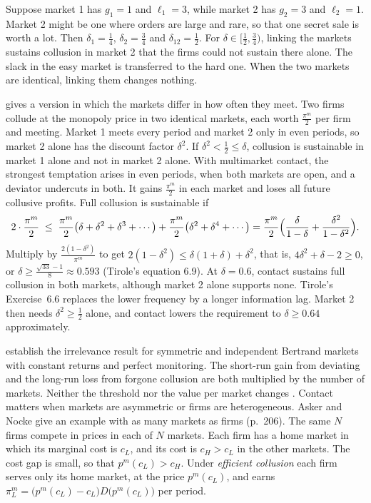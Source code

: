 Suppose market 1 has $g_1 = 1$ and $\ell_1 = 3$, while market 2 has $g_2 = 3$ and $\ell_2 = 1$. Market 2 might be
one where orders are large and rare, so that one secret sale is worth a lot. Then $\delta_1 = \frac{1}{4}$,
$\delta_2 = \frac{3}{4}$ and $\delta_{12} = \frac{1}{2}$. For $\delta \in [\frac{1}{2}, \frac{3}{4})$, linking the
markets sustains collusion in market 2 that the firms could not sustain there alone. The slack in the easy market
is transferred to the hard one. When the two markets are identical, linking them changes nothing.

\citet[section~6.3.2.5]{Tirole1988} gives a version in which the markets differ in how often they meet. Two firms
collude at the monopoly price in two identical markets, each worth $\frac{\pi^m}{2}$ per firm and meeting. Market 1
meets every period and market 2 only in even periods, so market 2 alone has the discount factor $\delta^2$. If
$\delta^2 < \frac{1}{2} \le \delta$, collusion is sustainable in market 1 alone and not in market 2 alone. With
multimarket contact, the strongest temptation arises in even periods, when both markets are open, and a deviator
undercuts in both. It gains $\frac{\pi^m}{2}$ in each market and loses all future collusive profits. Full collusion
is sustainable if
\begin{equation*}
2\cdot\frac{\pi^m}{2} \;\le\; \frac{\pi^m}{2}\bigl(\delta + \delta^2 + \delta^3 + \cdots\bigr)
+ \frac{\pi^m}{2}\bigl(\delta^2 + \delta^4 + \cdots\bigr)
= \frac{\pi^m}{2}\Bigl(\frac{\delta}{1 - \delta} + \frac{\delta^2}{1 - \delta^2}\Bigr) .
\end{equation*}
Multiply by $\frac{2(1 - \delta^2)}{\pi^m}$ to get $2(1 - \delta^2) \le \delta(1 + \delta) + \delta^2$, that is,
$4\delta^2 + \delta - 2 \ge 0$, or $\delta \ge \frac{\sqrt{33} - 1}{8} \approx 0.593$ (Tirole's equation 6.9). At
$\delta = 0.6$, contact sustains full collusion in both markets, although market 2 alone supports none.
Tirole's Exercise~6.6 replaces the lower frequency by a longer information lag. Market 2 then needs $\delta^2 \ge
\frac{1}{2}$ alone, and contact lowers the requirement to $\delta \ge 0.64$ approximately.

\citet{BernheimWhinston1990} establish the irrelevance result for symmetric and independent Bertrand markets with
constant returns and perfect monitoring. The short-run gain from deviating and the long-run loss from forgone
collusion are both multiplied by the number of markets. Neither the threshold nor the value per market changes
\citep[pp.~205--206]{AskerNocke2021}. Contact matters when markets are asymmetric or firms are heterogeneous.
Asker and Nocke give an example with as many markets as firms (p.~206). The same $N$ firms compete in prices in
each of $N$ markets. Each firm has a home market in which its marginal cost is $c_L$, and its cost is $c_H > c_L$ in
the other markets. The cost gap is small, so that $p^m(c_L) > c_H$. Under \emph{efficient collusion} each firm
serves only its home market, at the price $p^m(c_L)$, and earns
$\pi_L^m = \bigl(p^m(c_L) - c_L\bigr)D\bigl(p^m(c_L)\bigr)$ per period.

